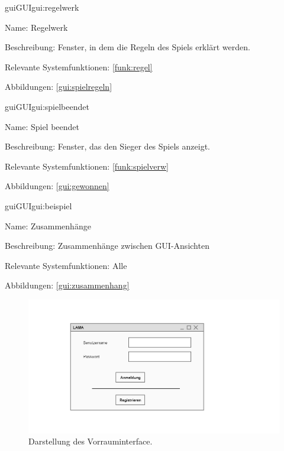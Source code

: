\begin{description}[leftmargin=5em, style=sameline]	
	\begin{lhp}{gui}{GUI}{gui:regelwerk}
		\item[Name:] Regelwerk
		\item[Beschreibung:] Fenster, in dem die Regeln des Spiels erklärt werden.
		\item[Relevante Systemfunktionen:] \ref{funk:regel}\\
		\item[Abbildungen:] \ref{gui:spielregeln}
	\end{lhp}
\end{description}

\begin{description}[leftmargin=5em, style=sameline]	
	\begin{lhp}{gui}{GUI}{gui:spielbeendet}
		\item[Name:] Spiel beendet
		\item[Beschreibung:] Fenster, das den Sieger des Spiels anzeigt.
		\item[Relevante Systemfunktionen:] \ref{funk:spielverw}
		\item[Abbildungen:] \ref{gui:gewonnen}
	\end{lhp}
\end{description}


\begin{description}[leftmargin=5em, style=sameline]	
	\begin{lhp}{gui}{GUI}{gui:beispiel}
		\item[Name:] Zusammenhänge
		\item[Beschreibung:] Zusammenhänge zwischen GUI-Ansichten
		\item[Relevante Systemfunktionen:] Alle
		\item[Abbildungen:] \ref{gui:zusammenhang}
	\end{lhp}
\end{description}

\break


\begin{figure}[h]
	\centering
	\includegraphics[width=\textwidth]{img/Vorraum.png}
	\caption{Darstellung des Vorrauminterface.}
	\label{gui:vorraum}
\end{figure}

